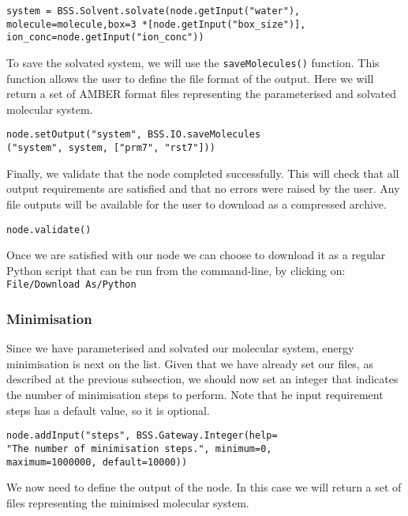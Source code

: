 \documentclass[9pt,tutorial]{livecoms}
\begin{document}
\begin{verbatim}
system = BSS.Solvent.solvate(node.getInput("water"),
molecule=molecule,box=3 *[node.getInput("box_size")],
ion_conc=node.getInput("ion_conc"))
\end{verbatim}

To save the solvated system, we will use the \texttt{saveMolecules()} function. This function allows the user to define the file format of the output. Here we will return a set of AMBER format files representing the parameterised and solvated molecular system. 

\begin{verbatim}
node.setOutput("system", BSS.IO.saveMolecules
("system", system, ["prm7", "rst7"]))
\end{verbatim}

Finally, we validate that the node completed successfully. This will check that all output requirements are satisfied and that no errors were raised by the user. Any file outputs will be available for the user to download as a compressed archive.

\begin{verbatim}
node.validate()
\end{verbatim}

Once we are satisfied with our node we can choose to download it as a regular Python script that can be run from the command-line, by clicking on: \texttt{File/Download As/Python}

\subsubsection{Minimisation}

Since we have parameterised and solvated our molecular system, energy minimisation is next on the list. Given that we have already set our files, as described at the previous subsection, we should now set an integer that indicates the number of minimisation steps to perform. Note that he input requirement steps has a default value, so it is optional.

\begin{verbatim}
node.addInput("steps", BSS.Gateway.Integer(help=
"The number of minimisation steps.", minimum=0,
maximum=1000000, default=10000))
\end{verbatim}

We now need to define the output of the node. In this case we will return a set of files representing the minimised molecular system.
\end{document}
